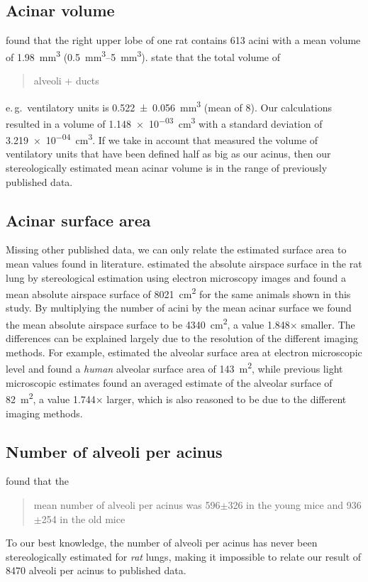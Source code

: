\documentclass[draft,a4paper,DIVcalc,abstract,english]{scrartcl}
\newcommand{\eg}{e.\,g.\ }
\newcommand{\meanacinarvolume}{1.148e-03} %
\newcommand{\std}{3.219e-04} %
\newcommand{\meannumberofalveoli}{8470} %
\newcommand{\meanairspacesurface}{4340} %
\newcommand{\airspacedifference}{1.848} %
\begin{document}
\subsection{Acinar volume}
\citet{Rodriguez1987} found that the right upper lobe of one rat contains 613 acini with a mean volume of \SI{1.98}{\milli\meter\cubed} (\SIrange{0.5}{5}{\milli\meter\cubed}).
\citet{Mercer1987a} state that the total volume of \blockquote{alveoli + ducts} \eg ventilatory units is \SI{0.522(56)}{\cubic\milli\meter} (mean of 8). %
Our calculations resulted in a volume of \SI{\meanacinarvolume}{\cubic\centi\meter} with a standard deviation of \SI{\std}{\cubic\centi\meter}.
If we take in account that \citep{Mercer1987a} measured the volume of ventilatory units that have been defined half as big as our acinus, then our stereologically estimated mean acinar volume is in the range of previously published data.

\subsection{Acinar surface area}
Missing other published data, we can only relate the estimated surface area to mean values found in literature.
\citet{Tschanz2003} estimated the absolute airspace surface in the rat lung by stereological estimation using electron microscopy images and found a mean absolute airspace surface of \SI{8021}{\centi\metre\squared} for the same animals shown in this study.
By multiplying the number of acini by the mean acinar surface we found the mean absolute airspace surface to be \SI{\meanairspacesurface}{\centi\metre\squared}, a value \airspacedifference\(\times\) smaller.
The differences can be explained largely due to the resolution of the different imaging methods.
For example, \citet{Gehr1978} estimated the alveolar surface area at electron microscopic level and found a \emph{human} alveolar surface area of \SI{143}{\square\meter}, while previous light microscopic estimates \citep{Weibel1963,Thurlbeck1967} found an averaged estimate of the alveolar surface of \SI{82}{\square\meter}, a value 1.744\(\times\) larger, which is also reasoned to be due to the different imaging methods.

\subsection{Number of alveoli per acinus}
\citet{Vasilescu2012} found that the \blockquote{mean number of alveoli per acinus was 596\(\pm\)326 in the young mice and 936\(\pm\)254 in the old mice}. To our best knowledge, the number of alveoli per acinus has never been stereologically estimated for \emph{rat} lungs, making it impossible to relate our result of \meannumberofalveoli\xspace alveoli per acinus to published data.
\end{document}
